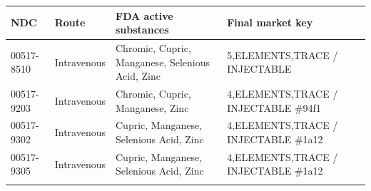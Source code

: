 \begin{tabular}{@{}llp{3.1cm}p{3.4cm}@{}}
\toprule
NDC & Route & FDA active substances & Final market key \\
\midrule
00517-8510 & Intravenous & Chromic, Cupric, Manganese, Selenious Acid, Zinc & 5,ELEMENTS,TRACE / INJECTABLE \\
00517-9203 & Intravenous & Chromic, Cupric, Manganese, Zinc & 4,ELEMENTS,TRACE / INJECTABLE \#94f1 \\
00517-9302 & Intravenous & Cupric, Manganese, Selenious Acid, Zinc & 4,ELEMENTS,TRACE / INJECTABLE \#1a12 \\
00517-9305 & Intravenous & Cupric, Manganese, Selenious Acid, Zinc & 4,ELEMENTS,TRACE / INJECTABLE \#1a12 \\
\botrule
\end{tabular}
